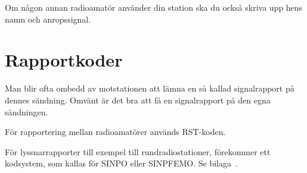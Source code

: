Om någon annan radioamatör använder din station ska du också skriva upp hens
namn och anropssignal.

\section{Rapportkoder}

Man blir ofta ombedd av motstationen att lämna en så kallad signalrapport på
dennes sändning.
Omvänt är det bra att få en signalrapport på den egna sändningen.

För rapportering mellan radioamatörer används RST-koden.

För lyssnarrapporter till exempel till rundradiostationer, förekommer ett
kodsystem, som kallas för SINPO eller SINPFEMO. Se bilaga~.
